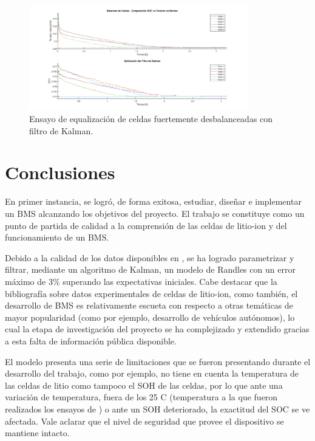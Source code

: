 \documentclass[10pt, a4paper]{report}
\begin{document}
\begin{figure}[h!]
	\begin{center}
		\includegraphics[width=0.85\textwidth]{MRG_loading_26_3_F.png}
		\caption{Ensayo de equalización de celdas fuertemente desbalanceadas con 
        filtro de Kalman.}
		\label{Test_BQ76_2}
	\end{center}
\end{figure}
\FloatBarrier

\chapter{Conclusiones}\label{conclusiones}
\thispagestyle{fancy}

En primer instancia, se logr\'o, de forma exitosa, estudiar, diseñar e 
implementar un \acrshort{BMS} alcanzando los objetivos del proyecto. El trabajo
se constituye como un punto de partida de calidad a la comprensi\'on de las 
celdas de litio-ion y del funcionamiento de un \acrshort{BMS}. 

Debido a la calidad de los datos disponibles en \cite{Kollmeyer2018}, se ha 
logrado parametrizar y filtrar, mediante un algoritmo de Kalman, un modelo de 
Randles con un error m\'aximo de 3\% superando las expectativas iniciales. Cabe
destacar que la bibliograf\'ia sobre datos experimentales de celdas de
litio-ion, como tambi\'en, el desarrollo de \acrshort{BMS} es relativamente
escueta con respecto a otras tem\'aticas de mayor popularidad (como por ejemplo,
desarrollo de veh\'iculos aut\'onomos), lo cual la etapa de investigaci\'on del
proyecto se ha complejizado y extendido gracias a esta falta de informaci\'on
p\'ublica disponible.

El modelo presenta una serie de limitaciones que se fueron presentando durante 
el desarrollo del trabajo, como por ejemplo, no tiene en cuenta la temperatura 
de las celdas de litio como tampoco el \acrshort{SOH} de las celdas, por lo que 
ante una variaci\'on de temperatura, fuera de los 25 \degree C (temperatura a 
la que fueron realizados los ensayos de \cite{Kollmeyer2018}) o ante un 
\acrshort{SOH} deteriorado, la exactitud del \acrshort{SOC} se ve afectada. Vale 
aclarar que el nivel de seguridad que provee el dispositivo se mantiene intacto.
\end{document}
